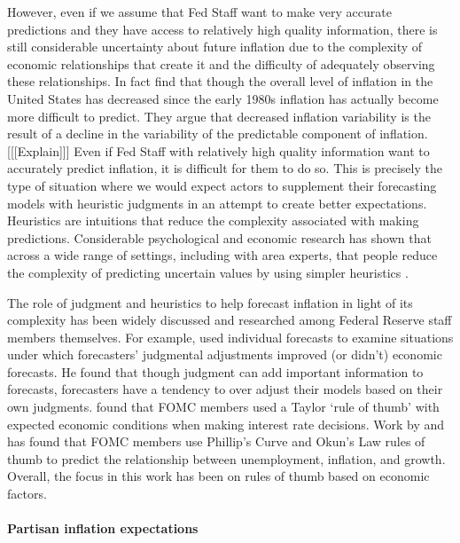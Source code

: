 \documentclass[a4paper]{article}
\begin{document}
However, even if we assume that Fed Staff want to make very accurate predictions and they have access to relatively high quality information, there is still considerable uncertainty about future inflation due to the complexity of economic relationships that create it and the difficulty of adequately observing these relationships. In fact \cite{Gamber2009} find that though the overall level of inflation in the United States has decreased since the early 1980s inflation has actually become more difficult to predict. They argue that decreased inflation variability is the result of a decline in the variability of the predictable component of inflation. [[[Explain]]] Even if Fed Staff with relatively high quality information want to accurately predict inflation, it is difficult for them to do so. This is precisely the type of situation where we would expect actors to supplement their forecasting models with heuristic judgments in an attempt to create better expectations. Heuristics are intuitions that reduce the complexity associated with making predictions. Considerable psychological and economic research has shown that across a wide range of settings, including with area experts, that people reduce the complexity of predicting uncertain values by using simpler heuristics \citep[see][]{kahneman1973,tverskykahneman1974,Tversky1983,Kahneman2002,kahneman2003}. 

The role of judgment and heuristics to help forecast inflation in light of its complexity has been widely discussed and researched among Federal Reserve staff members themselves. For example, \cite{McNees1990} used individual forecasts to examine situations under which forecasters' judgmental adjustments improved (or didn't) economic forecasts. He found that though judgment can add important information to forecasts, forecasters have a tendency to over adjust their models based on their own judgments. \cite{Orphanides2008} found that FOMC members used a Taylor `rule of thumb' \citeyearpar{Taylor1993} with expected economic conditions when making interest rate decisions. Work by \cite{Tillmann2010Philips} and \cite{KnotekII2007} has found that FOMC members use Phillip's Curve and Okun's Law rules of thumb to predict the relationship between unemployment, inflation, and growth. Overall, the focus in this work has been on rules of thumb based on economic factors.

\paragraph{Partisan inflation expectations}
\end{document}
